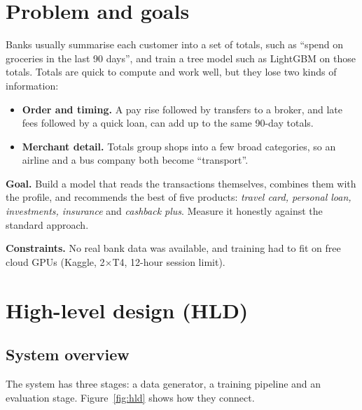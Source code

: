\documentclass[10pt,a4paper]{article}
\begin{document}
\section{Problem and goals}
Banks usually summarise each customer into a set of totals, such as ``spend on groceries in the last 90 days'', and train a tree model such as LightGBM on those totals. Totals are quick to compute and work well, but they lose two kinds of information:
\begin{itemize}
\item \textbf{Order and timing.} A pay rise followed by transfers to a broker, and late fees followed by a quick loan, can add up to the same 90-day totals.
\item \textbf{Merchant detail.} Totals group shops into a few broad categories, so an airline and a bus company both become ``transport''.
\end{itemize}
\textbf{Goal.} Build a model that reads the transactions themselves, combines them with the profile, and recommends the best of five products: \emph{travel card, personal loan, investments, insurance} and \emph{cashback plus}. Measure it honestly against the standard approach.

\textbf{Constraints.} No real bank data was available, and training had to fit on free cloud GPUs (Kaggle, 2$\times$T4, 12-hour session limit).

\section{High-level design (HLD)}
\subsection{System overview}
The system has three stages: a data generator, a training pipeline and an evaluation stage. Figure~\ref{fig:hld} shows how they connect.
\end{document}
